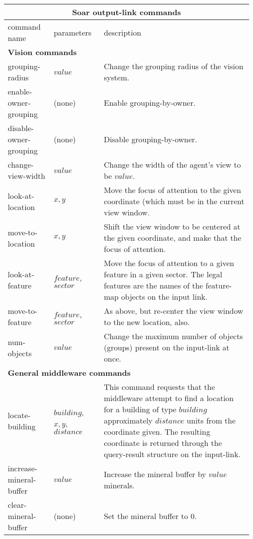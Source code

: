 \begin{center}
\begin{table}[h]
\begin{minipage}{6.5in}
\begin{tabular}{|l|p{1.0in}|p{3.5in}|}
\hline
\multicolumn{3}{|c|}{\textbf{Soar output-link commands}}\\ 
\hline
command name &  parameters & description \\
\hline \hline
\multicolumn{3}{|l|}{\textbf{Vision commands}}\\ 
\hline
grouping-radius & $value$ & Change the grouping radius of the vision system. \\
\hline
enable-owner-grouping & (none) & Enable grouping-by-owner.\\
\hline
disable-owner-grouping & (none) & Disable grouping-by-owner.\\
\hline
change-view-width & $value$ & Change the width of the agent's view to be $value$.\\
\hline 
look-at-location & $x,y$ & Move the focus of attention to the given coordinate (which must be in the current view window.\\
\hline
move-to-location & $x,y$ & Shift the view window to be centered at the given coordinate, and make that the focus of attention. \\
\hline
look-at-feature & $feature$, $sector$ & Move the focus of attention to a given feature in a given sector. The legal features are the names of the feature-map objects on the input link.\\
\hline
move-to-feature & $feature$, $sector$ & As above, but re-center the view window to the new location, also.\\
\hline
num-objects & $value$ & Change the maximum number of objects (groups) present on the input-link at once.\\
\hline
\multicolumn{3}{|l|}{\textbf{General middleware commands}}\\ 
\hline
locate-building & $building$, $x,y$, $distance$ & This command requests that the middleware attempt to find a location for a building of type $building$ approximately $distance$ units from the coordinate given. The resulting coordinate is returned through the query-result structure on the input-link. \\
\hline
increase-mineral-buffer & $value$ & Increase the mineral buffer by $value$ minerals.\\
\hline
clear-mineral-buffer & (none) & Set the mineral buffer to 0.\\

\end{tabular}
\end{minipage}
\end{table}
\end{center}

